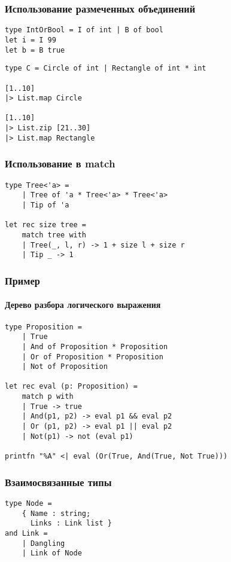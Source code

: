 \documentclass[xetex,mathserif,serif]{beamer}
\begin{document}
    \begin{frame}[fragile]
        \frametitle{Использование размеченных объединений}
        \begin{verbatim}
type IntOrBool = I of int | B of bool
let i = I 99
let b = B true
        \end{verbatim}
        
        \begin{verbatim}
type C = Circle of int | Rectangle of int * int

[1..10]
|> List.map Circle

[1..10]
|> List.zip [21..30]
|> List.map Rectangle
        \end{verbatim}
    \end{frame}

    \begin{frame}[fragile]
        \frametitle{Использование в match}
        \begin{verbatim}
type Tree<'a> =
    | Tree of 'a * Tree<'a> * Tree<'a>
    | Tip of 'a

let rec size tree =
    match tree with
    | Tree(_, l, r) -> 1 + size l + size r
    | Tip _ -> 1
        \end{verbatim}
    \end{frame}

    \begin{frame}[fragile]
        \frametitle{Пример}
        \framesubtitle{Дерево разбора логического выражения}
        \begin{verbatim}
type Proposition =
    | True
    | And of Proposition * Proposition
    | Or of Proposition * Proposition
    | Not of Proposition

let rec eval (p: Proposition) =
    match p with
    | True -> true
    | And(p1, p2) -> eval p1 && eval p2
    | Or (p1, p2) -> eval p1 || eval p2
    | Not(p1) -> not (eval p1)

printfn "%A" <| eval (Or(True, And(True, Not True)))
        \end{verbatim}
    \end{frame}

    \begin{frame}[fragile]
        \frametitle{Взаимосвязанные типы}
        \begin{verbatim}
type Node =
    { Name : string;
      Links : Link list }
and Link =
    | Dangling
    | Link of Node
        \end{verbatim}
    \end{frame}
\end{document}
